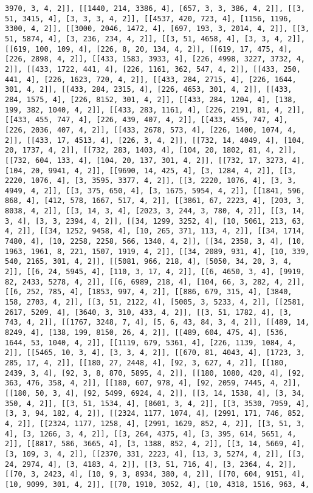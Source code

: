 \documentclass[12pt,fleqn]{article}\usepackage{../../common}
\begin{document}
\begin{verbatim}
3970, 3, 4, 2]], [[1440, 214, 3386, 4], [657, 3, 3, 386, 4, 2]], [[3, 51, 3415, 4], [3, 3, 3, 4, 2]], [[4537, 420, 723, 4], [1156, 1196, 3300, 4, 2]], [[3000, 2046, 1472, 4], [697, 193, 3, 2014, 4, 2]], [[3, 51, 5874, 4], [3, 236, 234, 4, 2]], [[3, 51, 4658, 4], [3, 3, 4, 2]], [[619, 100, 109, 4], [226, 8, 20, 134, 4, 2]], [[619, 17, 475, 4], [226, 2898, 4, 2]], [[433, 1583, 3933, 4], [226, 4998, 3227, 3732, 4, 2]], [[433, 1722, 441, 4], [226, 1161, 362, 547, 4, 2]], [[433, 250, 441, 4], [226, 1623, 720, 4, 2]], [[433, 284, 2715, 4], [226, 1644, 301, 4, 2]], [[433, 284, 2315, 4], [226, 4653, 301, 4, 2]], [[433, 284, 1575, 4], [226, 8152, 301, 4, 2]], [[433, 284, 1204, 4], [138, 199, 382, 1040, 4, 2]], [[433, 283, 1161, 4], [226, 2191, 81, 4, 2]], [[433, 455, 747, 4], [226, 439, 407, 4, 2]], [[433, 455, 747, 4], [226, 2036, 407, 4, 2]], [[433, 2678, 573, 4], [226, 1400, 1074, 4, 2]], [[433, 17, 4513, 4], [226, 3, 4, 2]], [[732, 14, 4049, 4], [104, 20, 1737, 4, 2]], [[732, 283, 1403, 4], [104, 20, 1802, 81, 4, 2]], [[732, 604, 133, 4], [104, 20, 137, 301, 4, 2]], [[732, 17, 3273, 4], [104, 20, 9941, 4, 2]], [[9690, 14, 425, 4], [3, 1284, 4, 2]], [[3, 2220, 1076, 4], [3, 3595, 3377, 4, 2]], [[3, 2220, 1076, 4], [3, 3, 4949, 4, 2]], [[3, 375, 650, 4], [3, 1675, 5954, 4, 2]], [[1841, 596, 868, 4], [412, 578, 1667, 517, 4, 2]], [[3861, 67, 2223, 4], [203, 3, 8038, 4, 2]], [[3, 14, 3, 4], [2023, 3, 244, 3, 780, 4, 2]], [[3, 14, 3, 4], [3, 3, 2394, 4, 2]], [[34, 1299, 3252, 4], [10, 5061, 213, 63, 4, 2]], [[34, 1252, 9458, 4], [10, 265, 371, 113, 4, 2]], [[34, 1714, 7480, 4], [10, 2258, 2258, 566, 1340, 4, 2]], [[34, 2358, 3, 4], [10, 1963, 1961, 8, 221, 1507, 1919, 4, 2]], [[34, 2089, 931, 4], [10, 339, 540, 2165, 301, 4, 2]], [[5081, 966, 218, 4], [5050, 34, 20, 3, 4, 2]], [[6, 24, 5945, 4], [110, 3, 17, 4, 2]], [[6, 4650, 3, 4], [9919, 82, 2433, 5278, 4, 2]], [[6, 6989, 218, 4], [104, 66, 3, 282, 4, 2]], [[6, 252, 785, 4], [1853, 997, 4, 2]], [[886, 679, 315, 4], [3840, 158, 2703, 4, 2]], [[3, 51, 2122, 4], [5005, 3, 5233, 4, 2]], [[2581, 2617, 5209, 4], [3640, 3, 310, 433, 4, 2]], [[3, 51, 1782, 4], [3, 743, 4, 2]], [[1767, 3248, 7, 4], [5, 6, 43, 84, 3, 4, 2]], [[489, 14, 8249, 4], [138, 199, 8150, 26, 4, 2]], [[489, 604, 475, 4], [536, 1644, 53, 1040, 4, 2]], [[1119, 679, 5361, 4], [226, 1139, 1084, 4, 2]], [[5465, 10, 3, 4], [3, 3, 4, 2]], [[670, 81, 4043, 4], [1723, 3, 285, 17, 4, 2]], [[180, 27, 2448, 4], [92, 3, 627, 4, 2]], [[180, 2439, 3, 4], [92, 3, 8, 870, 5895, 4, 2]], [[180, 1080, 420, 4], [92, 363, 476, 358, 4, 2]], [[180, 607, 978, 4], [92, 2059, 7445, 4, 2]], [[180, 50, 3, 4], [92, 5499, 6924, 4, 2]], [[3, 14, 1538, 4], [3, 34, 350, 4, 2]], [[3, 51, 1534, 4], [8601, 3, 4, 2]], [[3, 3530, 7959, 4], [3, 3, 94, 182, 4, 2]], [[2324, 1177, 1074, 4], [2991, 171, 746, 852, 4, 2]], [[2324, 1177, 1258, 4], [2991, 1629, 852, 4, 2]], [[3, 51, 3, 4], [3, 1266, 3, 4, 2]], [[3, 264, 4375, 4], [3, 395, 614, 5651, 4, 2]], [[8817, 586, 3665, 4], [3, 1388, 852, 4, 2]], [[3, 14, 5669, 4], [3, 109, 3, 4, 2]], [[2370, 331, 2223, 4], [13, 3, 5274, 4, 2]], [[3, 24, 2974, 4], [3, 4183, 4, 2]], [[3, 51, 716, 4], [3, 2364, 4, 2]], [[70, 3, 2423, 4], [10, 9, 3, 8934, 380, 4, 2]], [[70, 604, 9151, 4], [10, 9099, 301, 4, 2]], [[70, 1910, 3052, 4], [10, 4318, 1516, 963, 4, 
\end{verbatim}
\end{document}
